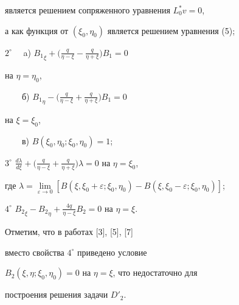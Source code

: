 является решением сопряженного уравнения $L_0^*v=0$,


а как функция от $(\xi_0,\eta_0)$ является решением уравнения (5);


\smallskip





$2^\circ$ \ \ a) ${B_1}_\xi + 


\big({\frac{q}{\eta-\xi}-\frac{q}{\eta+\xi}}\big)B_1=0$ 


на $\eta=\eta_0$,


\smallskip





$\qquad$б) ${B_1}_\eta - 


\big({\frac{q}{\eta-\xi}+\frac{q}{\eta+\xi}}\big)B_1=0$ 


на $\xi=\xi_0$,


\smallskip





$\qquad$в) $B(\xi_0,\eta_0;\xi_0,\eta_0)=1$;


\smallskip





$3^\circ$ ${\frac{d\lambda}{d\xi}+


\big(\frac{q}{\eta-\xi}+\frac{q}{\eta+\xi}


\big)}\lambda=0$ на $\eta=\xi_0$, 





где $\displaystyle\lambda=\lim\limits_{\varepsilon \to 0}


\left[B(\xi,\xi_0+\varepsilon;\xi_0,\eta_0)


-B(\xi,\xi_0 -\varepsilon;\xi_0,\eta_0)\right]$;


\smallskip





$4^\circ$ ${B_2}_\xi-{B_2}_\eta+{\frac{4q}{\eta-\xi}} 


B_2=0$ на $\eta=\xi$.








\begin{note}


Отметим, что в работах [3], [5], [7] 


вместо свойства $4^\circ$ приведено условие


$B_2(\xi,\eta;\xi_0,\eta_0)=0$ на $\eta=\xi$, что недостаточно для 


построения решения задачи $D'_2$.  


\end{note}





